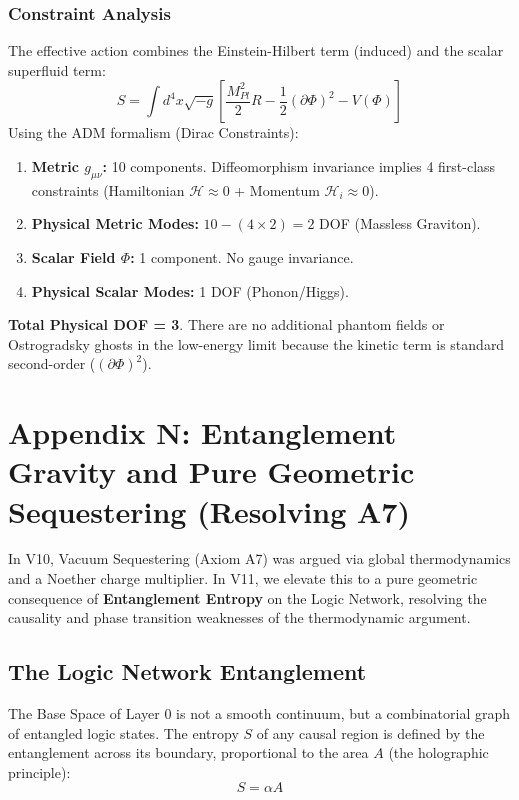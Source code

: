 \documentclass[a4paper,12pt]{article}
\begin{document}
\subsubsection{Constraint Analysis}
The effective action combines the Einstein-Hilbert term (induced) and the scalar superfluid term:
\begin{equation}
    S = \int d^4x \sqrt{-g} \left[ \frac{M_{Pl}^2}{2} R - \frac{1}{2}(\partial \Phi)^2 - V(\Phi) \right]
\end{equation}
Using the ADM formalism (Dirac Constraints):
\begin{enumerate}
    \item \textbf{Metric $g_{\mu\nu}$:} 10 components. Diffeomorphism invariance implies 4 first-class constraints (Hamiltonian $\mathcal{H} \approx 0$ + Momentum $\mathcal{H}_i \approx 0$).
    \item \textbf{Physical Metric Modes:} $10 - (4 \times 2) = 2$ DOF (Massless Graviton).
    \item \textbf{Scalar Field $\Phi$:} 1 component. No gauge invariance.
    \item \textbf{Physical Scalar Modes:} 1 DOF (Phonon/Higgs).
\end{enumerate}
\textbf{Total Physical DOF = 3}.
There are no additional phantom fields or Ostrogradsky ghosts in the low-energy limit because the kinetic term is standard second-order ($(\partial \Phi)^2$).

\section{Appendix N: Entanglement Gravity and Pure Geometric Sequestering (Resolving A7)}

In V10, Vacuum Sequestering (Axiom A7) was argued via global thermodynamics and a Noether charge multiplier. In V11, we elevate this to a pure geometric consequence of \textbf{Entanglement Entropy} on the Logic Network, resolving the causality and phase transition weaknesses of the thermodynamic argument.

\subsection{The Logic Network Entanglement}
The Base Space of Layer 0 is not a smooth continuum, but a combinatorial graph of entangled logic states. The entropy $S$ of any causal region is defined by the entanglement across its boundary, proportional to the area $A$ (the holographic principle):
\begin{equation}
    S = \alpha A
\end{equation}
\end{document}
